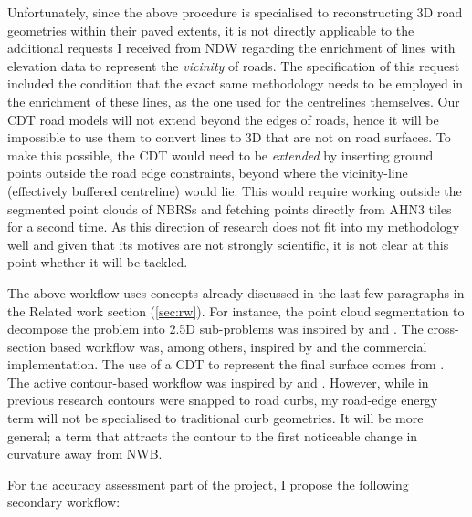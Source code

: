 Unfortunately, since the above procedure is specialised to reconstructing 3D road geometries within their paved extents, it is not directly applicable to the additional requests I received from NDW regarding the enrichment of lines with elevation data to represent the \textit{vicinity} of roads. The specification of this request included the condition that the exact same methodology needs to be employed in the enrichment of these lines, as the one used for the centrelines themselves. Our CDT road models will not extend beyond the edges of roads, hence it will be impossible to use them to convert lines to 3D that are not on road surfaces. To make this possible, the CDT would need to be \textit{extended} by inserting ground points outside the road edge constraints, beyond where the vicinity-line (effectively buffered centreline) would lie. This would require working outside the segmented point clouds of NBRSs and fetching points directly from AHN3 tiles for a second time. As this direction of research does not fit into my methodology well and given that its motives are not strongly scientific, it is not clear at this point whether it will be tackled.

The above workflow uses concepts already discussed in the last few paragraphs in the Related work section (\ref{sec:rw}). For instance, the point cloud segmentation to decompose the problem into 2.5D sub-problems was inspired by \cite{oudeElberink_vosselman_2009} and \cite{boyko_funkhauser_2011}. The cross-section based workflow was, among others, inspired by \cite{yang_etal_2013} and the commercial implementation. The use of a CDT to represent the final surface comes from \cite{oudeElberink_vosselman_2006}. The active contour-based workflow was inspired by \cite{boyko_funkhauser_2011} and \cite{gopfert_etal_2011}. However, while in previous research contours were snapped to road curbs, my road-edge energy term will not be specialised to traditional curb geometries. It will be more general; a term that attracts the contour to the first noticeable change in curvature away from NWB.

For the accuracy assessment part of the project, I propose the following secondary workflow:

